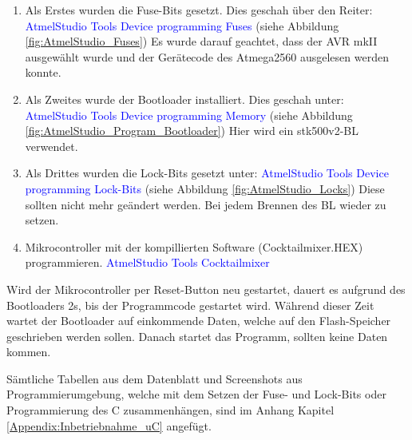 \begin{enumerate}
\item Als Erstes wurden die Fuse-Bits gesetzt. Dies geschah über den Reiter:\newline
\textcolor{blue}{AtmelStudio \textrightarrow Tools \textrightarrow Device programming \textrightarrow Fuses} (siehe Abbildung \ref{fig:AtmelStudio_Fuses}) \newline
Es wurde darauf geachtet, dass der AVR mkII ausgewählt wurde und der Gerätecode des Atmega2560 ausgelesen werden konnte.\newline

\item Als Zweites wurde der Bootloader installiert. Dies geschah unter:\newline
\textcolor{blue}{AtmelStudio \textrightarrow Tools \textrightarrow Device programming \textrightarrow Memory} (siehe Abbildung \ref{fig:AtmelStudio_Program_Bootloader}) \newline
Hier wird ein stk500v2-BL verwendet.\newline
\item Als Drittes wurden die Lock-Bits gesetzt unter:\newline
\textcolor{blue}{AtmelStudio \textrightarrow Tools \textrightarrow Device programming \textrightarrow Lock-Bits} (siehe Abbildung \ref{fig:AtmelStudio_Locks})\newline
Diese sollten nicht mehr geändert werden. Bei jedem Brennen des BL wieder zu setzen.\newline
\item Mikrocontroller mit der kompillierten Software (Cocktailmixer.HEX) programmieren.\newline
\textcolor{blue}{AtmelStudio \textrightarrow Tools \textrightarrow Cocktailmixer}\newline
\end{enumerate}

Wird der Mikrocontroller per Reset-Button neu gestartet, dauert es aufgrund des Bootloaders 2s, bis der Programmcode gestartet wird. Während dieser Zeit wartet der Bootloader auf einkommende Daten, welche auf den Flash-Speicher geschrieben werden sollen. Danach startet das Programm, sollten keine Daten kommen.

Sämtliche Tabellen aus dem Datenblatt und Screenshots aus Programmierumgebung, welche mit dem Setzen der Fuse- und Lock-Bits oder Programmierung des \textmu C zusammenhängen, sind im Anhang Kapitel \ref{Appendix:Inbetriebnahme_uC} angefügt.